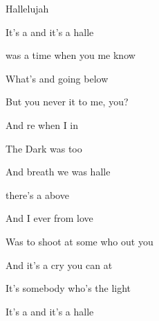 \begin{SBSong}{Hallelujah}
\begin{SBVerse}
    It's a  and it's a  halle
  \end{SBVerse}
  \CBPageBrk
  \begin{SBVerse}
     was a time when you  me know
    
    What's  and going  below
    
    But  you never  it to me,  you? 

    And re when I  in 
    
    The  Dark was  too
    
    And  breath we  was halle
  \end{SBVerse}
  \begin{SBVerse}
     there's a  above
    
    And  I ever  from love
    
    Was  to shoot at some who out you 
 
    And it's  a cry you can  at 
    
    It's  somebody who's  the light
    
    It's a  and it's a  halle
  \end{SBVerse}
\end{SBSong}
